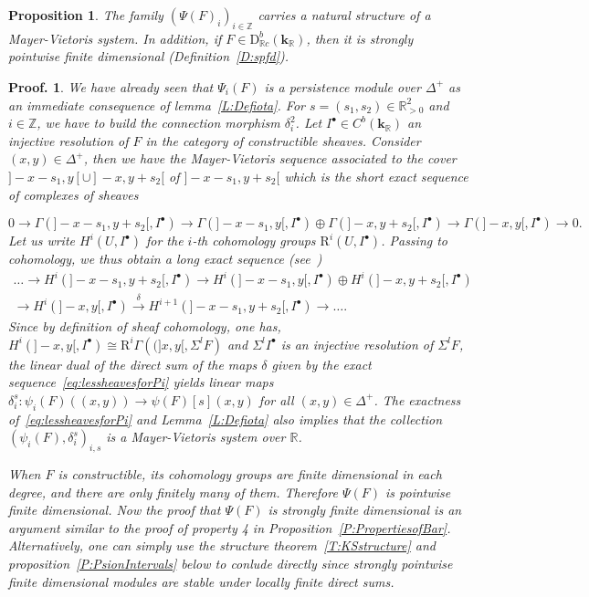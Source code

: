 \documentclass[a4paper, english, 11pt]{article}
\newcommand{\kk}[0]{\textbf{k}}
\newcommand{\0}{\vec{0}}
\newcommand{\R}[0]{\mathbb{R}}
\newcommand{\Z}[0]{\mathbb{Z}}
\newcommand{\D}[0]{\text{D}}
\newcommand{\Rr}[0]{\text{R}}
\newtheorem{prop}{Proposition}[section]
\newtheorem*{pf}{Proof.} }
\begin{document}
\begin{prop}\label{P:psiofCOnstrisMV}
The family $(\Psi(F)_i)_{i\in \Z}$ carries a natural structure of a Mayer-Vietoris system. In addition, if $F\in \D^b_{\R c}(\kk_\R)$, then  it is strongly pointwise finite dimensional (Definition~\ref{D:spfd}). 
\end{prop}

\begin{pf} We have already seen  that $\Psi_i(F)$ is a persistence module over $\Delta^+$ as an immediate consequence of lemma~\ref{L:Defiota}.
For $s = (s_1,s_2)\in \R^2_{>0}$ and $i\in\Z$, we have to build the connection morphism $\delta_i^2$. Let $I^\bullet\in C^b(\kk_\R)$ an injective resolution of $F$ in the category of constructible sheaves. Consider $(x,y)\in \Delta^+$, then we have the Mayer-Vietoris sequence associated to the cover $]-x - s_1 , y[ \cup ]-x , y + s_2[ $ of $]-x - s_1 , y + s_2[$ which is the short exact sequence of complexes of sheaves 

$$0 \longrightarrow \Gamma(]-x - s_1 , y + s_2[, I^\bullet) \longrightarrow \Gamma(]-x - s_1 , y[, I^\bullet) \oplus  \Gamma(]-x , y+s_2[, I^\bullet) \longrightarrow \Gamma(]-x,y[, I^\bullet) \longrightarrow 0 .$$
Let us write $H^i(U, I^\bullet)$ for the $i$-th cohomology groups $\Rr^i(U, I^\bullet)$. 
Passing to cohomology, we thus obtain a long exact sequence (see~\cite{Kash90}) 
\begin{multline}\label{eq:lessheavesforPi} 
\dots \to     H^i(]-x-s_1, y+s_2[, I^\bullet) \to 
 H^i(]-x-s_1, y[, I^\bullet) \oplus  H^i(]-x, y+s_2[, I^\bullet) \\ \to 
  H^i(]-x, y[, I^\bullet) \stackrel{\delta}\to H^{i+1}(]-x-s_1, y+s_2[, I^\bullet) \to \dots.
\end{multline}
Since by definition of sheaf cohomology, one has, $H^i(]-x, y[, I^\bullet) \cong \Rr^i\Gamma \left ( (]x,y[ , \Sigma^l F\right )$ and $\Sigma^l I^\bullet$ is an injective resolution of $\Sigma^l F$, the linear dual of the direct sum of the maps $\delta$ given by the exact sequence~\eqref{eq:lessheavesforPi} yields linear maps $\delta_i^s:\psi_i(F)((x,y)) \to \psi(F)[s](x,y)$ for all $(x,y) \in \Delta^+$. The exactness of~\eqref{eq:lessheavesforPi} and Lemma~\ref{L:Defiota} also implies that the collection $(\psi_i(F), \delta_i^s)_{i,s}$ is a Mayer-Vietoris system over $\R$.

\smallskip 

When $F$ is constructible, its cohomology groups are finite dimensional in each degree, and there are only finitely many of them. Therefore $\Psi(F)$ is pointwise finite dimensional. Now the proof that $\Psi(F)$ is strongly finite dimensional is an argument similar to the proof of property 4 in Proposition~\ref{P:PropertiesofBar}. Alternatively, one can simply use the structure theorem~\ref{T:KSstructure}
and proposition~\ref{P:PsionIntervals} below to conlude directly since  strongly pointwise finite dimensional modules are stable under locally finite direct sums.\end{pf}
\end{document}

